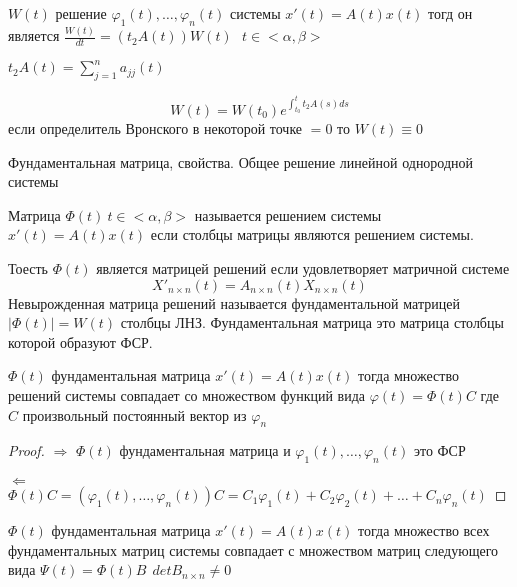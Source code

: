 \begin{theorem}
  $W(t)$ решение $\varphi_1(t), \ldots, \varphi_n(t)$ системы $x'(t) = A(t)x(t)$
  тогд он является $\frac{W(t)}{dt} = (t_2A(t))W(t) ~~~ t \in <\alpha, \beta>$

  $t_2A(t) = \sum_{j=1}^n a_{jj}(t)$
\end{theorem}

\begin{block}
  $$
  W(t) = W(t_0)e^{\int_{t_0}^t t_2 A(s)ds}
  $$
  если определитель Вронского в некоторой точке $= 0$ то $W(t) \equiv 0$
\end{block}

\begin{title}[\Large]
  Фундаментальная матрица, свойства. Общее решение линейной однородной системы
\end{title}

\begin{define}
  Матрица $\Phi(t) ~ t \in <\alpha, \beta>$ называется решением системы
  $x'(t) = A(t)x(t)$ если столбцы матрицы являются решением системы.

  Тоесть $\Phi(t)$ является матрицей решений если удовлетворяет матричной
  системе
  $$
  X'_{n \times n}(t) = A_{n \times n}(t) X_{n \times n}(t)
  $$
  Невырожденная матрица решений называется фундаментальной матрицей
  $|\Phi(t)| = W(t)$ столбцы ЛНЗ. Фундаментальная матрица это матрица столбцы
  которой образуют ФСР.
\end{define}

\begin{theorem}
  $\Phi(t)$ фундаментальная матрица $x'(t) = A(t)x(t)$
  тогда множество решений системы совпадает со множеством функций вида
  $\varphi(t) = \Phi(t)C$ где $C$ произвольный постоянный вектор из $\varphi_n$
\end{theorem}

\begin{proof}
  $\Rightarrow$ $\Phi(t)$ фундаментальная матрица и $\varphi_1(t), \ldots,
  \varphi_n(t)$ это ФСР

  $\Leftarrow$ $\Phi(t)C = (\varphi_1(t), \ldots, \varphi_n(t))C = C_1
  \varphi_1(t) + C_2 \varphi_2(t) + \ldots + C_n \varphi_n(t)$
\end{proof}

\begin{theorem}
  $\Phi(t)$ фундаментальная матрица $x'(t) = A(t)x(t)$ тогда множество всех
  фундаментальных матриц системы совпадает с множеством матриц следующего вида
  $\Psi(t) = \Phi(t)B ~~ detB_{n \times n} \not= 0$
\end{theorem}

